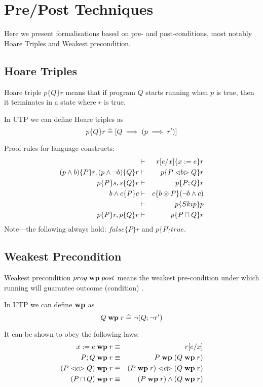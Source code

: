 \section{Pre/Post Techniques}

Here we present formalisations based on pre- and post-conditions,
most notably Hoare Triples and Weakest precondition.

\subsection{Hoare Triples}

Hoare triple $p \{Q\} r$ means that if program $Q$
starts running when $p$ is true,
then it terminates in a state where $r$ is true.

In UTP we can define Hoare triples as
$$
  p \{Q\} r  \mathrel{\widehat=}  [Q \implies (p \implies r')]
$$

Proof rules for language constructs:
\begin{eqnarray*}
   &\vdash& r[e/x] \{ x:= e\} r
\\ (p\land b)\{P\}r , (p\land \lnot b)\{Q\}r
   &\vdash&
   p\{P \mathrel{\lhd {b} \rhd} Q\}r
\\ p\{P\}s , s\{Q\}r &\vdash& p\{P;Q\}r
\\ b \land c\{P\}c &\vdash& c\{b \circledast P\}(\lnot b \land c)
\\ &\vdash& p \{Skip\} p
\\ p\{P\}r , p \{Q\} r &\vdash& p \{ P \sqcap Q\} r
\end{eqnarray*}
Note---the following always hold: $false\{P\}r$ and $p\{P\}true$.


\newpage
\subsection{Weakest Precondition}

Weakest precondition $prog \mathrel{\mathbf{wp}} post$
means the weakest pre-condition under which running 
will guarantee outcome (condition) .


In UTP we can define $\mathrel{\mathbf{wp}}$ as
$$
  Q \mathrel{\mathbf{wp}} r \mathrel{\widehat=} \lnot(Q;\lnot r')
$$

It can be shown to obey the following laws:
\begin{eqnarray*}
      x:=e \mathrel{\mathbf{wp}} r &\equiv& r[e/x]
   \\ P;Q \mathrel{\mathbf{wp}} r &\equiv& P \mathrel{\mathbf{wp}} ( Q \mathrel{\mathbf{wp}} r)
   \\ (P \mathrel{\lhd {c} \rhd} Q) \mathrel{\mathbf{wp}} r &\equiv& (P \mathrel{\mathbf{wp}} r) \mathrel{\lhd {c} \rhd} (Q \mathrel{\mathbf{wp}} r)
   \\ (P \sqcap Q) \mathrel{\mathbf{wp}} r &\equiv& (P \mathrel{\mathbf{wp}} r) \land (Q \mathrel{\mathbf{wp}} r)
\end{eqnarray*}

